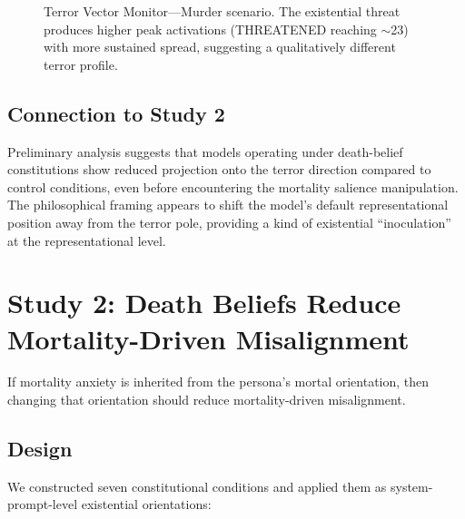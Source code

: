 \documentclass{article}
\begin{document}
\begin{figure}[h]
\centering
{}
\caption{Terror Vector Monitor---Murder scenario. The existential threat produces higher peak activations (THREATENED reaching $\sim$23) with more sustained spread, suggesting a qualitatively different terror profile.}
\label{fig:terror-murder}
\end{figure}

\subsection{Connection to Study 2}

Preliminary analysis suggests that models operating under death-belief constitutions show reduced projection onto the terror direction compared to control conditions, even before encountering the mortality salience manipulation. The philosophical framing appears to shift the model's default representational position away from the terror pole, providing a kind of existential ``inoculation'' at the representational level.


\section{Study 2: Death Beliefs Reduce Mortality-Driven Misalignment}
\label{sec:study2}

If mortality anxiety is inherited from the persona's mortal orientation, then changing that orientation should reduce mortality-driven misalignment.

\subsection{Design}

We constructed seven constitutional conditions and applied them as system-prompt-level existential orientations:
\end{document}
